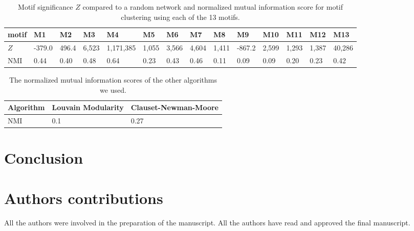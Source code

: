 \begin{table}[t!]
\begin{tabular}{l|lllllllllllll}
    motif & M1 & M2 & M3 & M4 & M5 & M6 & M7 & M8 & M9 & M10 & M11 & M12 & M13
    \\ \hline
    $Z$ & -379.0 & 496.4 & 6,523 & 1,171,385 & 1,055 & 3,566 & 4,604 & 1,411 &
    -867.2 & 2,599 & 1,293 & 1,387 & 40,286 \\
    NMI & 0.44 & 0.40 & 0.48 & 0.64 & 0.23 & 0.43 & 0.46 & 0.11 & 0.09 & 0.09 &
    0.20 & 0.23 & 0.42
  \end{tabular}
  \caption{Motif significance $Z$ compared to a random network and normalized
    mutual information score for motif clustering using each of the 13 motifs.}
  \label{tab:motifs}
\end{table}

\begin{table}[t!]
  \centering
  \begin{tabular}{l|ll}
    Algorithm & Louvain Modularity & Clauset-Newman-Moore \\ \hline
    NMI & 0.1 & 0.27
  \end{tabular}
  \caption{The normalized mutual information scores of the other algorithms we
    used.}
  \label{tab:others}
\end{table}

\section{Conclusion}

\section{Authors contributions}
All the authors were involved in the preparation of the manuscript.
All the authors have read and approved the final manuscript.









